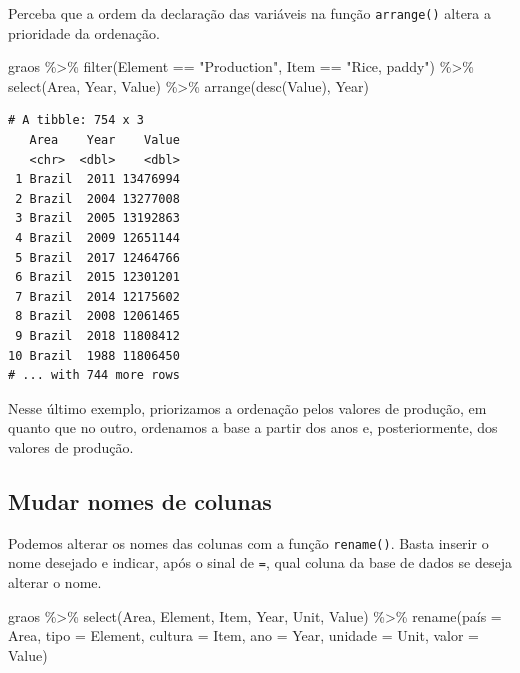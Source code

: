 \documentclass[
  brazilian,
]{book}
\newenvironment{Shaded}{\begin{snugshade}}{\end{snugshade}}
\newcommand{\AttributeTok}[1]{\textcolor[rgb]{0.77,0.63,0.00}{#1}}
\newcommand{\FunctionTok}[1]{\textcolor[rgb]{0.00,0.00,0.00}{#1}}
\newcommand{\NormalTok}[1]{#1}
\newcommand{\OtherTok}[1]{\textcolor[rgb]{0.56,0.35,0.01}{#1}}
\newcommand{\SpecialCharTok}[1]{\textcolor[rgb]{0.00,0.00,0.00}{#1}}
\newcommand{\StringTok}[1]{\textcolor[rgb]{0.31,0.60,0.02}{#1}}
\begin{document}
Perceba que a ordem da declaração das variáveis na função \texttt{arrange()} altera a prioridade da ordenação.

\begin{Shaded}
\begin{Highlighting}[]
\NormalTok{graos }\SpecialCharTok{\%\textgreater{}\%} 
  \FunctionTok{filter}\NormalTok{(Element }\SpecialCharTok{==} \StringTok{"Production"}\NormalTok{,}
\NormalTok{         Item }\SpecialCharTok{==} \StringTok{"Rice, paddy"}\NormalTok{) }\SpecialCharTok{\%\textgreater{}\%} 
  \FunctionTok{select}\NormalTok{(Area, Year, Value) }\SpecialCharTok{\%\textgreater{}\%} 
  \FunctionTok{arrange}\NormalTok{(}\FunctionTok{desc}\NormalTok{(Value), Year)}
\end{Highlighting}
\end{Shaded}

\begin{verbatim}
# A tibble: 754 x 3
   Area    Year    Value
   <chr>  <dbl>    <dbl>
 1 Brazil  2011 13476994
 2 Brazil  2004 13277008
 3 Brazil  2005 13192863
 4 Brazil  2009 12651144
 5 Brazil  2017 12464766
 6 Brazil  2015 12301201
 7 Brazil  2014 12175602
 8 Brazil  2008 12061465
 9 Brazil  2018 11808412
10 Brazil  1988 11806450
# ... with 744 more rows
\end{verbatim}

Nesse último exemplo, priorizamos a ordenação pelos valores de produção, em quanto que no outro, ordenamos a base a partir dos anos e, posteriormente, dos valores de produção.

\hypertarget{mudar-nomes-de-colunas}{%
\subsection{Mudar nomes de colunas}\label{mudar-nomes-de-colunas}}

Podemos alterar os nomes das colunas com a função \texttt{rename()}. Basta inserir o nome desejado e indicar, após o sinal de \texttt{=}, qual coluna da base de dados se deseja alterar o nome.

\begin{Shaded}
\begin{Highlighting}[]
\NormalTok{graos }\SpecialCharTok{\%\textgreater{}\%} 
  \FunctionTok{select}\NormalTok{(Area, Element, Item, Year, Unit, Value) }\SpecialCharTok{\%\textgreater{}\%} 
  \FunctionTok{rename}\NormalTok{(}\StringTok{\textasciigrave{}}\AttributeTok{país}\StringTok{\textasciigrave{}} \OtherTok{=}\NormalTok{ Area, }\AttributeTok{tipo =}\NormalTok{ Element, }\AttributeTok{cultura =}\NormalTok{ Item, }\AttributeTok{ano =}\NormalTok{ Year, }
         \AttributeTok{unidade =}\NormalTok{ Unit, }\AttributeTok{valor =}\NormalTok{ Value)}
\end{Highlighting}
\end{Shaded}
\end{document}
